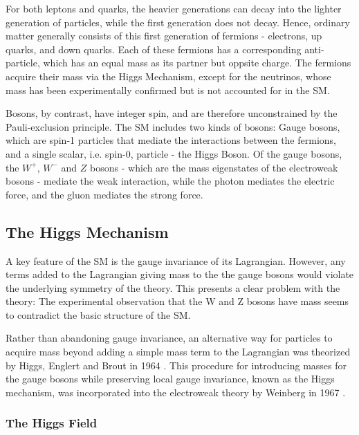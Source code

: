 For both leptons and quarks, the heavier generations can decay into the lighter generation of particles, while the first generation does not decay. Hence, ordinary matter generally consists of this first generation of fermions - electrons, up quarks, and down quarks. Each of these fermions has a corresponding anti-particle, which has an equal mass as its partner but oppsite charge. The fermions acquire their mass via the Higgs Mechanism, except for the neutrinos, whose mass has been experimentally confirmed but is not accounted for in the SM. 

Bosons, by contrast, have integer spin, and are therefore unconstrained by the Pauli-exclusion principle. The SM includes two kinds of bosons: Gauge bosons, which are spin-1 particles that mediate the interactions between the fermions, and a single scalar, i.e. spin-0, particle - the Higgs Boson. Of the gauge bosons, the $W^+$, $W^-$ and $Z$ bosons - which are the mass eigenstates of the electroweak bosons - mediate the weak interaction, while the photon mediates the electric force, and the gluon mediates the strong force. 


\subsection{The Higgs Mechanism}
\label{sec:higgsMech}

A key feature of the SM is the gauge invariance of its Lagrangian. However, any terms added to the Lagrangian giving mass to the the gauge bosons would violate the underlying symmetry of the theory. This presents a clear problem with the theory: The experimental observation that the W and Z bosons have mass seems to contradict the basic structure of the SM. 

Rather than abandoning gauge invariance, an alternative way for particles to acquire mass beyond adding a simple mass term to the Lagrangian was theorized by Higgs, Englert and Brout in 1964 \cite{}. This procedure for introducing masses for the gauge bosons while preserving local gauge invariance, known as the Higgs mechanism, was incorporated into the electroweak theory by Weinberg in 1967 \cite{}.  

\subsubsection{The Higgs Field}
\label{sec:higgsField}

